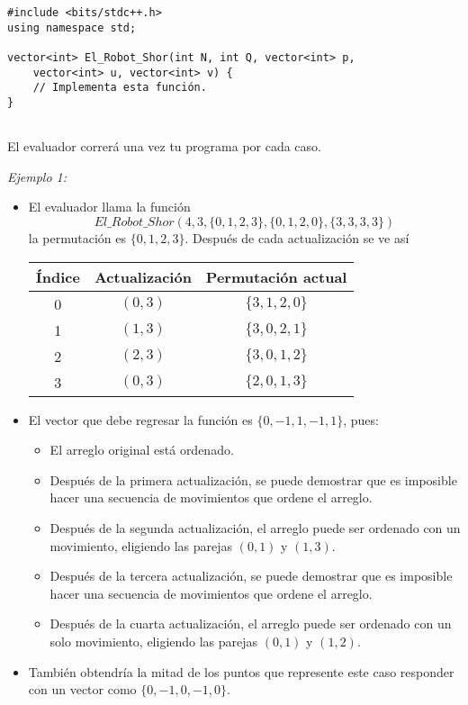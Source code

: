\documentclass[12pt]{scrartcl}
\begin{document}
\begin{verbatim}
#include <bits/stdc++.h>
using namespace std;

vector<int> El_Robot_Shor(int N, int Q, vector<int> p,
    vector<int> u, vector<int> v) {
    // Implementa esta función.
}
    
\end{verbatim}

    El evaluador correrá una vez tu programa por cada caso.
    

               
        {\itshape Ejemplo 1:}
        \begin{itemize}
            \item El evaluador llama la función $$El\_Robot\_Shor(4, 3, \{0, 1, 2, 3\}, \{0, 1, 2, 0\}, \{3, 3, 3, 3\})$$
            la permutación es $\{0, 1, 2, 3 \}$. Después de cada actualización se ve así
            \begin{center}
                \begin{tabular}{|c|c|c|}
                    \hline
                    Índice & Actualización & Permutación actual \\
                    \hline
                    \hline
                     0 & $(0, 3)$ &  $\{3, 1, 2, 0\}$ \\
                     \hline
                     1 & $(1, 3)$ & $\{3, 0, 2, 1\}$ \\
                     \hline
                     2 & $(2, 3)$ & $\{3, 0, 1, 2\}$ \\
                     \hline
                     3 & $(0, 3)$ & $\{2, 0, 1, 3\}$ \\
                     \hline
                \end{tabular}
            \end{center}
            \item El vector que debe regresar la función es $\{0, -1, 1 , -1, 1\}$, pues:
            \begin{itemize}
                \item  El arreglo original está ordenado.
                \item  Después de la primera actualización, se puede demostrar que es imposible hacer una secuencia de movimientos que ordene el arreglo.
                \item Después de la segunda actualización, el arreglo puede ser ordenado con un movimiento, eligiendo las parejas $(0, 1)$ y $(1, 3)$.
                \item  Después de la tercera actualización, se puede demostrar que es imposible hacer una secuencia de movimientos que ordene el arreglo.
                \item Después de la cuarta actualización, el arreglo puede ser ordenado con un solo movimiento, eligiendo las parejas $(0, 1)$ y $(1, 2)$.
            \end{itemize}
            \item También obtendría la mitad de los puntos que represente este caso responder con un vector como $\{0, -1, 0, -1, 0\}$.
        \end{itemize}
        
\end{document}

